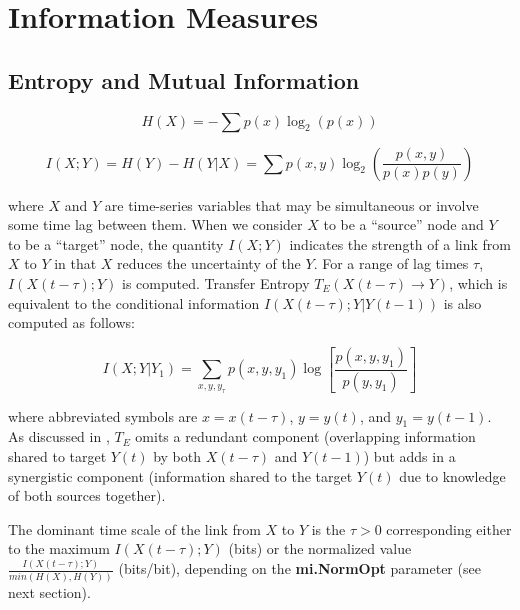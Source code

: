 \documentclass[a4paper]{article}
\begin{document}
\section{Information Measures}
\label{sec:measures}

\subsection{Entropy and Mutual Information}

\begin{equation}
H(X)= -\sum p(x) \log_2(p(x))
\end{equation}
 
\begin{equation}
I(X;Y) = H(Y) - H(Y|X) = \sum p(x,y) \log_2\left(\frac{p(x,y)}{p(x)p(y)}\right)
\end{equation}

\noindent
where $X$ and $Y$ are time-series variables that may be simultaneous or involve some time lag between them.  When we consider $X$ to be a ``source'' node and $Y$ to be a ``target'' node, the quantity $I(X;Y)$ indicates the strength of a link from $X$ to $Y$ in that $X$ reduces the uncertainty of the $Y$.  For a range of lag times $\tau$, $I(X(t-\tau);Y)$ is computed.  Transfer Entropy $T_E(X(t-\tau) \rightarrow Y)$, which is equivalent to the conditional information $I(X(t-\tau);Y|Y(t-1))$ is also computed as follows:

\begin{equation}\label{eq:T}
I(X;Y|Y_1) = \sum_{x,y,y_\tau} p(x,y,y_1)\log\left[\frac{p(x,y,y_1)}{p(y,y_1)}\right]
\end{equation} 

where abbreviated symbols are $x=x(t-\tau)$, $y = y(t)$, and $y_1 = y(t-1)$.  As discussed in \cite{Goodwell2015}, $T_E$ omits a redundant component (overlapping information shared to target $Y(t)$ by both $X(t-\tau)$ and $Y(t-1)$) but adds in a synergistic component (information shared to the target $Y(t)$ due to knowledge of both sources together).

The dominant time scale of the link from $X$ to $Y$ is the $\tau>0$ corresponding either to the maximum $I(X(t-\tau);Y)$ (bits) or the normalized value $\frac{I(X(t-\tau);Y)}{min(H(X),H(Y))}$ (bits/bit), depending on the \textbf{mi.NormOpt} parameter (see next section).  
\end{document}
